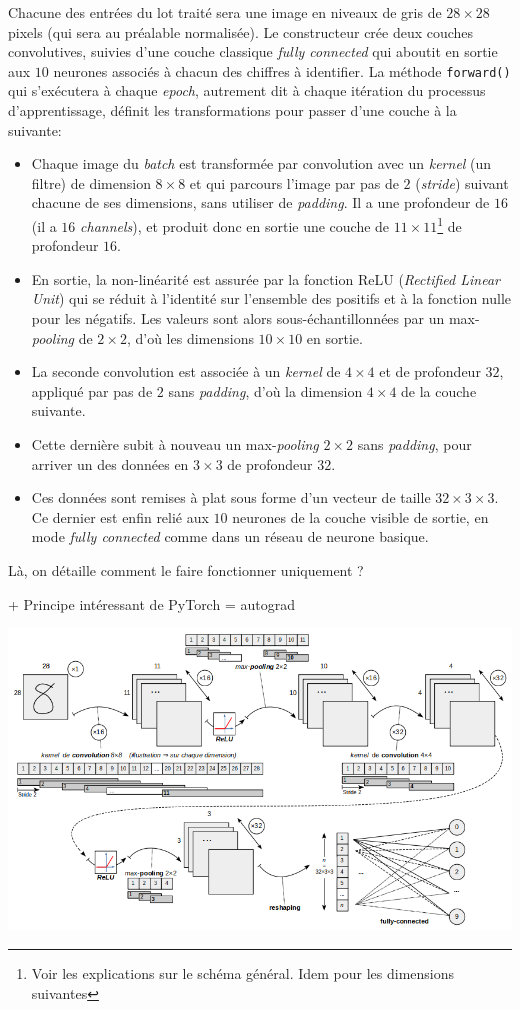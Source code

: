 \documentclass[a4paper,11pt]{article} %
\newcommand{\ttt}[1]{\texttt{#1}}
\begin{document}
Chacune des entrées du lot traité sera une image en niveaux de gris de $28\times28$ pixels (qui sera au préalable normalisée). Le constructeur crée deux couches convolutives, suivies d'une couche classique \emph{fully connected} qui aboutit en sortie aux $10$ neurones associés à chacun des chiffres à identifier. La méthode \ttt{forward()} qui s'exécutera à chaque \emph{epoch}, autrement dit à chaque itération du processus d'apprentissage, définit les transformations pour passer d'une couche à la suivante: 
\begin{itemize}
	\item 
	Chaque image du \emph{batch} est transformée par convolution avec un \emph{kernel} (un filtre) de dimension $8\times8$ et qui parcours l'image par pas de $2$ (\emph{stride}) suivant chacune de ses dimensions, sans utiliser de \emph{padding}. Il a une profondeur de $16$ (il a $16$ \emph{channels}), et produit donc en sortie une couche de $11\times11$\footnote{Voir les explications sur le schéma général. Idem pour les dimensions suivantes} de profondeur $16$.
	\item 
	En sortie, la non-linéarité est assurée par la fonction ReLU (\emph{Rectified Linear Unit}) qui se réduit à l'identité sur l'ensemble des positifs et à la fonction nulle pour les négatifs. Les valeurs sont alors sous-échantillonnées par un \og max-\emph{pooling}\fg{} de $2\times2$, d'où les dimensions $10\times10$ en sortie. 
	\item 
	La seconde convolution est associée à un \emph{kernel} de $4\times4$ et de profondeur $32$, appliqué par pas de $2$ sans \emph{padding}, d'où la dimension $4\times4$ de la couche suivante.
	\item 
	Cette dernière subit à nouveau un max-\emph{pooling} $2\times2$ sans \emph{padding}, pour arriver un des données en $3\times3$ de profondeur $32$. 
	\item 
	Ces données sont remises \og à plat\fg{} sous forme d'un vecteur de taille $32\times3\times3$. Ce dernier est enfin relié aux $10$ neurones de la couche visible de sortie, en mode \emph{fully connected} comme dans un réseau de neurone basique. 
\end{itemize}
Là, on détaille comment le faire fonctionner uniquement ?

+ Principe intéressant de PyTorch = autograd
\begin{landscape}
	\includegraphics[width=\linewidth]{cnn.png}
\end{landscape}
\end{document}
